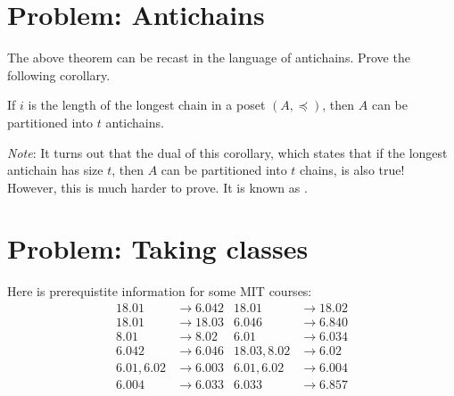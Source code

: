 \documentclass[12pt]{article}
\begin{document}
\section{Problem: Antichains}
The above theorem can be recast in the language of antichains. Prove the following corollary.
\begin{corollary}
If $i$ is the length of the longest chain in a poset $(A, \preceq)$, then $A$ can be partitioned into $t$ antichains.
\end{corollary}
\emph{Note}: It turns out that the dual of this corollary, which states that if the longest antichain has size $t$, then $A$ can be partitioned into $t$ chains, is also true! However, this is much harder to prove. It is known as .


\fi

\section{Problem: Taking classes}
Here is prerequistite information for some MIT courses:
%
\begin{align*}
18.01 & \to 6.042 & 18.01 & \to 18.02 \\
18.01 & \to 18.03 & 6.046 & \to 6.840 \\
8.01 & \to 8.02 & 6.01 & \to 6.034 \\
6.042 & \to 6.046 & 18.03, 8.02 & \to 6.02 \\
6.01, 6.02 & \to 6.003 & 6.01, 6.02 & \to 6.004 \\
6.004 & \to 6.033 & 6.033 & \to 6.857
\end{align*}
\end{document}
